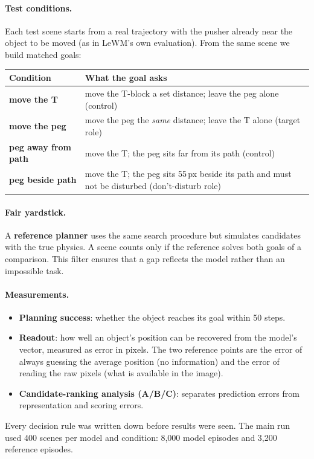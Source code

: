 \documentclass[11pt]{article}
\begin{document}
\paragraph{Test conditions.} Each test scene starts from a real trajectory with the pusher already near the object to be moved (as in LeWM's own evaluation). From the same scene we build matched goals:
\begin{center}
\begin{tabularx}{\linewidth}{@{}lL@{}}
\toprule
Condition & What the goal asks \\
\midrule
\textbf{move the T} & move the T-block a set distance; leave the peg alone (control) \\
\textbf{move the peg} & move the peg the \emph{same} distance; leave the T alone (target role) \\
\textbf{peg away from path} & move the T; the peg sits far from its path (control) \\
\textbf{peg beside path} & move the T; the peg sits 55\,px beside its path and must not be disturbed (don't-disturb role) \\
\bottomrule
\end{tabularx}
\end{center}

\paragraph{Fair yardstick.} A \textbf{reference planner} uses the same search procedure but simulates candidates with the true physics. A scene counts only if the reference solves both goals of a comparison. This filter ensures that a gap reflects the model rather than an impossible task.

\paragraph{Measurements.}
\begin{itemize}
  \item \textbf{Planning success}: whether the object reaches its goal within 50 steps.
  \item \textbf{Readout}: how well an object's position can be recovered from the model's vector, measured as error in pixels. The two reference points are the error of always guessing the average position (no information) and the error of reading the raw pixels (what is available in the image).
  \item \textbf{Candidate-ranking analysis (A/B/C)}: separates prediction errors from representation and scoring errors.
\end{itemize}
Every decision rule was written down before results were seen. The main run used 400 scenes per model and condition: 8,000 model episodes and 3,200 reference episodes.
\end{document}
